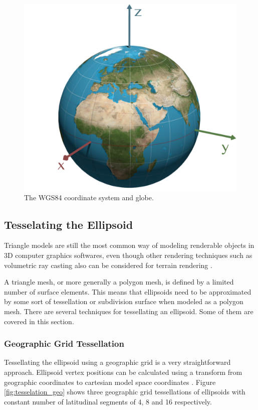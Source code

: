 \begin{figure}
\centering
\includegraphics[scale=0.25]{figures/wgs84.pdf}
\caption{The WGS84 coordinate system and globe.}
\label{fig:wgs84}
\end{figure}

\subsection{Tesselating the Ellipsoid}

Triangle models are still the most common way of modeling renderable objects in 3D computer graphics softwares, even though other rendering techniques such as volumetric ray casting also can be considered for terrain rendering \cite{cozzi11}.

A triangle mesh, or more generally a polygon mesh, is defined by a limited number of surface elements. This means that ellipsoids need to be approximated by some sort of tessellation or subdivision surface when modeled as a polygon mesh. There are several techniques for tessellating an ellipsoid. Some of them are covered in this section.

\subsubsection{Geographic Grid Tessellation}
\label{sec:geogrid}
Tessellating the ellipsoid using a geographic grid is a very straightforward approach. Ellipsoid vertex positions can be calculated using a transform from geographic coordinates to cartesian model space coordinates \cite[p. 25]{cozzi11}. Figure \ref{fig:tesselation_geo} shows three geographic grid tessellations of ellipsoids with constant number of latitudinal segments of 4, 8 and 16 respectively.

